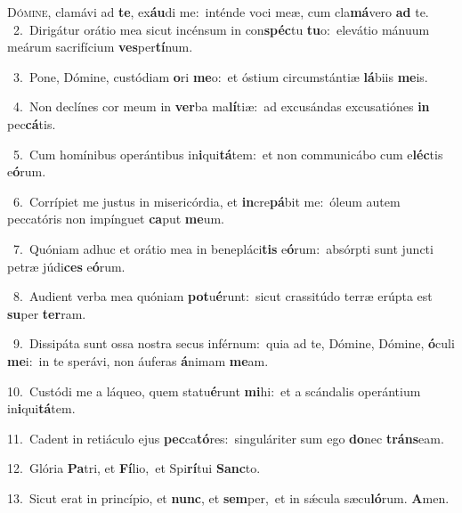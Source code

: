 \lettrine{\initial\textcolor{\initialcolor}{D}}{ómine,} clamávi ad \textbf{te}\-, ex\-\textbf{áu}\-di me:~\star inténde voci meæ, cum cla\-\textbf{má}\-vero \textbf{ad} te.\\
{\numbfont\textcolor{\numbcolor}{~2.}}~Dirigátur orátio mea sicut incénsum in con\-\textbf{spéc}\-tu \textbf{tu}\-o:~\star elevátio mánuum meárum sacrifícium \textbf{ves}\-per\-\textbf{tí}\-num.\par
{\numbfont\textcolor{\numbcolor}{~3.}}~Pone, Dómine, custódiam \textbf{o}\-ri \textbf{me}\-o:~\star et óstium circumstántiæ \textbf{lá}\-biis \textbf{me}\-is.\par
{\numbfont\textcolor{\numbcolor}{~4.}}~Non declínes cor meum in \textbf{ver}\-ba ma\-\textbf{lí}\-tiæ:~\star ad excusándas excusatiónes \textbf{in} pec\-\textbf{cá}\-tis.\par
{\numbfont\textcolor{\numbcolor}{~5.}}~Cum homínibus operántibus in\-\textbf{i}\-qui\-\textbf{tá}\-tem:~\star et non communicábo cum e\-\textbf{léc}\-tis e\-\textbf{ó}\-rum.\par
{\numbfont\textcolor{\numbcolor}{~6.}}~Corrípiet me justus in misericórdia, et \textbf{in}\-cre\-\textbf{pá}\-bit me:~\star óleum autem peccatóris non impínguet \textbf{ca}\-put \textbf{me}\-um.\par
{\numbfont\textcolor{\numbcolor}{~7.}}~Quóniam adhuc et orátio mea in benepláci\textbf{tis} e\-\textbf{ó}\-rum:~\star absórpti sunt juncti petræ júdi\textbf{ces} e\-\textbf{ó}\-rum.\par
{\numbfont\textcolor{\numbcolor}{~8.}}~Audient verba mea quóniam \textbf{pot}\-u\-\textbf{é}\-runt:~\star sicut crassitúdo terræ erúpta est \textbf{su}\-per \textbf{ter}\-ram.\par
{\numbfont\textcolor{\numbcolor}{~9.}}~Dissipáta sunt ossa nostra secus inférnum:~\dagger quia ad te, Dómine, Dómine, \textbf{ó}\-culi \textbf{me}\-i:~\star in te sperávi, non áuferas \textbf{á}\-nimam \textbf{me}\-am.\par
{\numbfont\textcolor{\numbcolor}{10.}}~Custódi me a láqueo, quem statu\-\textbf{é}\-runt \textbf{mi}\-hi:~\star et a scándalis operántium in\-\textbf{i}\-qui\-\textbf{tá}\-tem.\par
{\numbfont\textcolor{\numbcolor}{11.}}~Cadent in retiáculo ejus \textbf{pec}\-ca\-\textbf{tó}\-res:~\star singuláriter sum ego \textbf{do}\-nec \textbf{tráns}\-eam.\par
{\numbfont\textcolor{\numbcolor}{12.}}~Glória \textbf{Pa}\-tri, et \textbf{Fí}\-lio,~\star et Spi\-\textbf{rí}\-tui \textbf{Sanc}\-to.\par
{\numbfont\textcolor{\numbcolor}{13.}}~Sicut erat in princípio, et \textbf{nunc}\-, et \textbf{sem}\-per,~\star et in sǽcula sæcu\-\textbf{ló}\-rum. \textbf{A}\-men.\par
